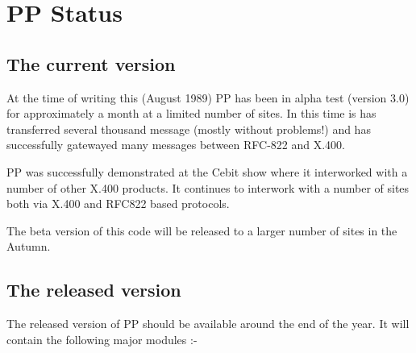 \section{PP Status}

\subsection{The current version}

At the time of writing this (August 1989) PP has been in alpha test
(version 3.0) for approximately a month at a limited number of sites.
In this time is has transferred several thousand message (mostly
without problems!)  and has successfully gatewayed many messages
between RFC-822 and X.400.

PP was successfully demonstrated at the Cebit show where it
interworked with a number of other X.400 products. It continues to
interwork with a number of sites both via X.400 and RFC822 based
protocols.

The beta version of this code will be released to a larger number of
sites in the Autumn. 

\subsection{The released version}
The released version of PP should be available around the end of the
year. It will contain the following major modules :-

